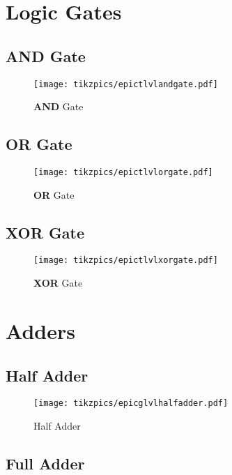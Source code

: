 \documentclass[a4paper, 10pt]{article}
\begin{document}
\section{Logic Gates}

\subsection{AND Gate}

\begin{figure}[!ht]
	\centering
    \texttt{[image: tikzpics/epictlvlandgate.pdf]}
	\caption{\textbf{AND} Gate}
\end{figure}

\subsection{OR Gate}

\begin{figure}[!hb]
	\centering
    \texttt{[image: tikzpics/epictlvlorgate.pdf]}
	\caption{\textbf{OR} Gate}
\end{figure}

\subsection{XOR Gate}

\begin{figure}[!hp]
	\centering
    \texttt{[image: tikzpics/epictlvlxorgate.pdf]}
	\caption{\textbf{XOR} Gate}
\end{figure}

\clearpage

\section{Adders}

\subsection{Half Adder}

\begin{figure}[!ht]
	\centering
    \texttt{[image: tikzpics/epicglvlhalfadder.pdf]}
	\caption{Half Adder}
\end{figure}

\vspace{0.2\textheight}

\subsection{Full Adder}
\end{document}
